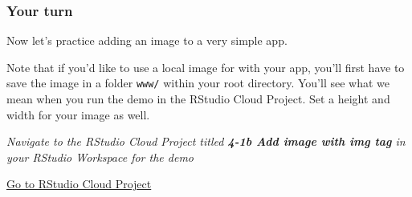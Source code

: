 \documentclass[
  letterpaper,
  DIV=11,
  numbers=noendperiod]{scrreprt}
\newenvironment{Shaded}{\begin{snugshade}}{\end{snugshade}}
\newcommand{\AttributeTok}[1]{\textcolor[rgb]{0.40,0.46,0.14}{#1}}
\newcommand{\CommentTok}[1]{\textcolor[rgb]{0.37,0.37,0.37}{#1}}
\newcommand{\ControlFlowTok}[1]{\textcolor[rgb]{0.00,0.46,0.62}{#1}}
\newcommand{\FunctionTok}[1]{\textcolor[rgb]{0.28,0.35,0.67}{#1}}
\newcommand{\NormalTok}[1]{\textcolor[rgb]{0.00,0.46,0.62}{#1}}
\newcommand{\OtherTok}[1]{\textcolor[rgb]{0.00,0.46,0.62}{#1}}
\newcommand{\SpecialCharTok}[1]{\textcolor[rgb]{0.37,0.37,0.37}{#1}}
\newcommand{\StringTok}[1]{\textcolor[rgb]{0.13,0.47,0.30}{#1}}
\begin{document}
\hypertarget{your-turn-29}{%
\subsubsection{Your turn}\label{your-turn-29}}

Now let's practice adding an image to a very simple app.

Note that if you'd like to use a local image for with your app, you'll
first have to save the image in a folder \texttt{www/} within your root
directory. You'll see what we mean when you run the demo in the RStudio
Cloud Project. Set a height and width for your image as well.

\emph{Navigate to the RStudio Cloud Project titled \textbf{4-1b Add
image with img tag} in your RStudio Workspace for the demo}

\href{https://rstudio.cloud/spaces/81721/join?access_code=I4VJaNsKfTqR3Td9hLP7E1nz8\%2FtMg6Xbw9Bgqumv}{
Go to RStudio Cloud Project}

\begin{Shaded}
\end{Shaded}
\end{document}
